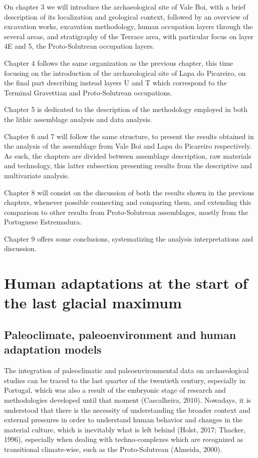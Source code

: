 \documentclass[12pt,twoside]{reedthesis}
\begin{document}
On chapter 3 we will introduce the archaeological site of Vale Boi, with a brief description of its localization and geological context, followed by an overview of excavation works, excavation methodology, human occupation layers through the several areas, and stratigraphy of the Terrace area, with particular focus on layer 4E and 5, the Proto-Solutrean occupation layers.

Chapter 4 follows the same organization as the previous chapter, this time focusing on the introduction of the archaeological site of Lapa do Picareiro, on the final part describing instead layers U and T which correspond to the Terminal Gravettian and Proto-Solutrean occupations.

Chapter 5 is dedicated to the description of the methodology employed in both the lithic assemblage analysis and data analysis.

Chapter 6 and 7 will follow the same structure, to present the results obtained in the analysis of the assemblage from Vale Boi and Lapa do Picareiro respectively. As such, the chapters are divided between assemblage description, raw materials and technology, this latter subsection presenting results from the descriptive and multivariate analysis.

Chapter 8 will consist on the discussion of both the results shown in the previous chapters, whenever possible connecting and comparing them, and extending this comparison to other results from Proto-Solutrean assemblages, mostly from the Portuguese Estremadura.

Chapter 9 offers some conclusions, systematizing the analysis interpretations and discussion.

\hypertarget{human-adaptations-at-the-start-of-the-last-glacial-maximum}{%
\chapter{Human adaptations at the start of the last glacial maximum}\label{human-adaptations-at-the-start-of-the-last-glacial-maximum}}

\hypertarget{paleoclimate-paleoenvironment-and-human-adaptation-models}{%
\section{Paleoclimate, paleoenvironment and human adaptation models}\label{paleoclimate-paleoenvironment-and-human-adaptation-models}}

The integration of paleoclimatic and paleoenvironmental data on archaeological studies can be traced to the last quarter of the twentieth century, especially in Portugal, which was also a result of the embryonic stage of research and methodologies developed until that moment (Cascalheira, 2010). Nowadays, it is understood that there is the necessity of understanding the broader context and external pressures in order to understand human behavior and changes in the material culture, which is inevitably what is left behind (Holst, 2017; Thacker, 1996), especially when dealing with techno-complexes which are recognized as transitional climate-wise, such as the Proto-Solutrean (Almeida, 2000).
\end{document}
